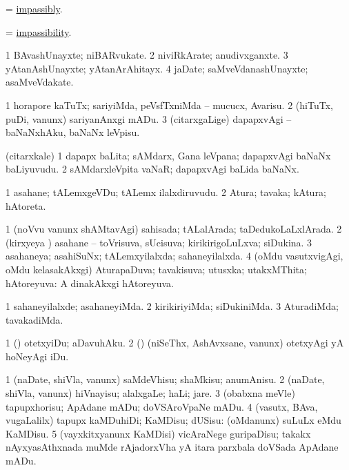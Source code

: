 \bentry
{}
\gl{\kirxvi}
\bmng
 = \hyperlink{impassibly}{impassibly}. 
\emng
\eentry

\bentry
{}
\gl{\nA}
\bmng
 = \hyperlink{impassibility}{impassibility}. 
\emng
\eentry

\bentry
{}
\gl{\nA}
\bmng
\bnum
\num{1} BAvashUnayxte; niBARvukate. 
\num{2} niviRkArate; anudivxganxte. 
\num{3} yAtanAshUnayxte; yAtanArAhitayx. 
\num{4} jaDate; saMveVdanashUnayxte; asaMveVdakate. 
\enum
\emng
\eentry

\bentry
{}
\gl{\sakirx}
\bmng
\bnum
\num{1} horapore kaTuTx; sariyiMda, peVsfTxniMda -- mucucx, Avarisu. 
\num{2} (hiTuTx, puDi, \mo vanunx) sariyanAnxgi mADu. 
\num{3} (citarxgaLige) dapapxvAgi -- baNaNxhAku, baNaNx leVpisu. 
\enum
\emng
\eentry

\bentry
{}
\gl{\nA}
\bmng
(citarxkale) 
\bnum
\num{1} dapapx baLita; sAMdarx, Gana leVpana; dapapxvAgi baNaNx baLiyuvudu. 
\num{2} sAMdarxleVpita vaNaR; dapapxvAgi baLida baNaNx. 
\enum
\emng
\eentry

\bentry
{}
\gl{\nA}
\bmng
\bnum
\num{1} asahane; tALemxgeVDu; tALemx ilalxdiruvudu. 
\num{2} Atura; tavaka; kAtura; hAtoreta. 
\enum
\emng
\eentry

\bentry
{}
\gl{\gu}
\bmng
\bnum
\num{1} (noVvu \mo vanunx shAMtavAgi) sahisada; tALalArada; taDedukoLaLxlArada. 
\num{2} (kirxyeya \vi) asahane -- toVrisuva, sUcisuva; kirikirigoLuLxva; siDukina. 
\num{3} asahaneya; asahiSuNx; tALemxyilalxda; sahaneyilalxda. 
\num{4} (oMdu vasutxvigAgi, oMdu kelasakAkxgi) AturapaDuva; tavakisuva; utusxka; utakxMThita; hAtoreyuva:  A dinakAkxgi hAtoreyuva. 
\enum
\emng
\eentry

\bentry
{}
\gl{\kirxvi}
\bmng
\bnum
\num{1} sahaneyilalxde; asahaneyiMda. 
\num{2} kirikiriyiMda; siDukiniMda. 
\num{3} AturadiMda; tavakadiMda. 
\enum
\emng
\eentry

\bentry
{}
\gl{\sakirx}
\bmng
\bnum
\num{1} (\pArxparx) otetxyiDu; aDavuhAku. 
\num{2} (\rUpa) (niSeThx, AshAvxsane, \mo vanunx) otetxyAgi yA hoNeyAgi iDu. 
\enum
\emng
\eentry

\bentry
{}
\gl{\sakirx}
\bmng
\bnum
\num{1} (naDate, shiVla, \mo vanunx) saMdeVhisu; shaMkisu; anumAnisu. 
\num{2} (naDate, shiVla, \mo vanunx) hiVnayisu; alalxgaLe; haLi; jare. 
\num{3} (obabxna meVle) tapupxhorisu; ApAdane mADu; doVSAroVpaNe mADu. 
\num{4} (vasutx, BAva, \mo vugaLalilx) tapupx kaMDuhiDi; KaMDisu; dUSisu:  (oMdanunx) suLuLx eMdu KaMDisu. 
\num{5} (vayxkitxyanunx KaMDisi) vicAraNege guripaDisu; takakx nAyxyasAthxnada muMde rAjadorxVha yA itara parxbala doVSada ApAdane mADu. 
\enum
\emng
\eentry

